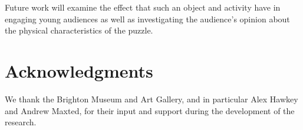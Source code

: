 \documentclass[acmlarge,screen,dvipsnames]{acmart}
\begin{document}
Future work will examine the effect that such an object and activity
have in engaging young audiences as well as investigating the
audience's opinion about the physical characteristics of the puzzle.

\section{Acknowledgments}

We thank the Brighton Museum and Art Gallery, and in particular Alex
Hawkey and Andrew Maxted, for their input and support during the
development of the research.

%


\end{document}
